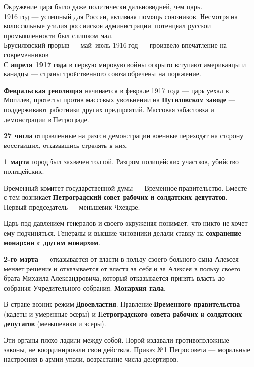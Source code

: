 \documentclass{article}
\begin{document}
\begin{enumerate}
    Окружение царя было даже политически дальновидней, чем царь. \\
    1916 год — успешный для России, активная помощь союзников. Несмотря на колоссальные усилия российской администрации, потенциал русской промышленности был слишком мал. \\
    Брусиловский прорыв — май–июль 1916 год — произвело впечатление на современников \\
    С \textbf{апреля 1917 года} в первую мировую войны открыто вступают американцы и канадцы — страны тройственного союза обречены на поражение.
\end{enumerate}

\textbf{Февральская революция} начинается в феврале 1917 года — царь уехал в Могилёв, протесты против массовых увольнений на \textbf{Путиловском заводе} — поддерживают работники других предприятий. Массовая забастовка и демонстрации в Петрограде.

\textbf{27 числа} отправленные на разгон демонстрации военные переходят на сторону восставших, отказавшись стрелять в них.

\textbf{1 марта} город был захвачен толпой. Разгром полицейских участков, убийство полицейских.

Временный комитет государственной думы — Временное правительство. Вместе с тем возникает \textbf{Петроградский совет рабочих и солдатских депутатов}. Первый председатель — меньшевик Чхеидзе.

Царь под давлением генералов и своего окружения понимает, что никто не хочет ему подчиняться. Генералы и высшие чиновники делали ставку на \textbf{сохранение монархии с другим монархом}.

\textbf{2-го марта} — отказывается от власти в пользу своего больного сына Алексея — меняет решение и отказывается от власти за себя и за Алексея в пользу своего брата Михаила Александровича, который отказывается принять власть до собрания Учредительного собрания. \textbf{Монархия пала}.

\hfill

В стране возник режим \textbf{Двоевластия}. Правление \textbf{Временного правительства} (кадеты и умеренные эсеры) и \textbf{Петроградского совета рабочих и солдатских депутатов} (меньшевики и эсеры).

Эти органы плохо ладили между собой. Порой издавали противоположные законы, не координировали свои действия. Приказ №1 Петросовета — моральные настроения в армии упали, возрастание числа дезертиров. 
\end{document}
